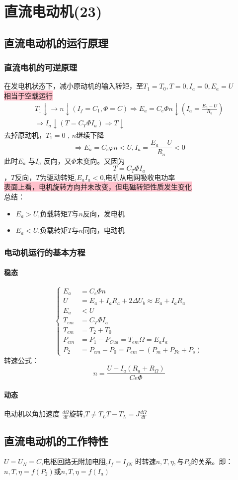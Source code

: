 \documentclass[blue]{elegantnote}
\begin{document}
\chapter{直流电动机(23)}
\section{直流电动机的运行原理}
\subsection{直流电机的可逆原理}
在发电机状态下，减小原动机的输入转矩，至${T_1} = {T_0},T = 0,{I_a} = 0,{E_a} = U$\\
\colorbox{pink}{相当于空载运行}
\[\begin{array}{l}
{T_1} \downarrow  \to n \downarrow ({{I_f} = {C_1},\Phi  = C})  \Rightarrow  {E_a} = {C_e}\Phi n \downarrow ({{I_a} = \frac{{{E_a} - U}}{{{R_a}}}})\\
\Rightarrow {I_a} \downarrow ({T = {C_T}\Phi {I_a}}) \Rightarrow T \downarrow 
\end{array}\]
去掉原动机，$T_1=0$ , $n$继续下降
\[ \Rightarrow {E_a} = {C_e}\varphi n < U,{I_a} = \frac{{{E_a} - U}}{{{R_a}}} < 0\]
此时$E_a$ 与$I_a$ 反向，又$\Phi$未变向。又因为$$T = {C_T}\Phi {I_a}$$，$T$反向，$T$为驱动转矩,${E_a}{I_a} < 0$,电机从电网吸收电功率\\
\colorbox{pink}{表面上看，电机旋转方向并未改变，但电磁转矩性质发生变化}\\
总结：
\begin{itemize}
	\item ${E_a}>U$,负载转矩$T$与$n$反向，发电机
	\item ${E_a}<U$,负载转矩$T$与$n$同向，电动机
\end{itemize}
\subsection{电动机运行的基本方程}
\subsubsection{稳态}
\begin{equation}
\left\{
\begin{aligned}
{E_a} &= {C_e}\Phi n\\
U &= {E_a} + {I_a}{R_a} + 2\Delta {U_b} \approx {E_a} + {I_a}{R_a}\\
{E_a} &< U\\
{T_{em}} &= {C_T}\Phi {I_a}\\
{T_{em}} &= {T_2} + {T_0}\\
{P_{em}} &= {P_1} - {P_{Cua}} = {T_{em}}\Omega  = {E_a}{I_a}\\
{P_2} &= {P_{em}} - {P_0} = {P_{em}} - ({P_m} + {P_{Fe}} + {P_s})
\end{aligned}
\right.
\end{equation}
转速公式：
$$n = \frac{{U - {I_a}({R_a} + {R_\Omega })}}{{Ce\Phi }}$$
\subsubsection{动态}
电动机以角加速度 $\frac{{d\Omega }}{{dt}}$旋转,$T \ne {T_L}T - {T_L} = J\frac{{d\Omega }}{{dt}}$
\section{直流电动机的工作特性}
$U = {U_N} = C$,电枢回路无附加电阻,$I_f =I_{fN}$ 时转速$n,T,\eta,$与$P_2$的关系。即：$n,T,\eta =f(P_2)$或$n,T,\eta=f(I_a)$
\end{document}
